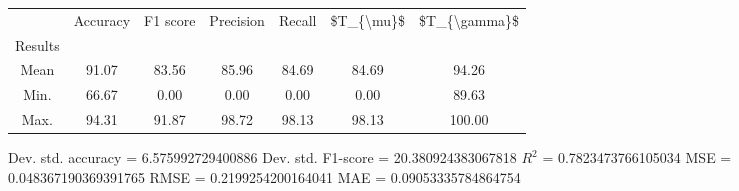 \begin{tabular}{|c|c|c|c|c|c|c|}
\toprule
{} &  Accuracy &  F1 score &  Precision &  Recall &  \$T\_\{\textbackslash mu\}\$ &  \$T\_\{\textbackslash gamma\}\$ \\
Results &           &           &            &         &            &               \\
\hline
Mean    &     91.07 &     83.56 &      85.96 &   84.69 &      84.69 &         94.26 \\
Min.    &     66.67 &      0.00 &       0.00 &    0.00 &       0.00 &         89.63 \\
Max.    &     94.31 &     91.87 &      98.72 &   98.13 &      98.13 &        100.00 \\
\bottomrule
\end{tabular}

 Dev. std. accuracy = 6.575992729400886
 Dev. std. F1-score = 20.380924383067818
 $R^2$ = 0.7823473766105034
 MSE = 0.048367190369391765
 RMSE = 0.2199254200164041
 MAE = 0.09053335784864754